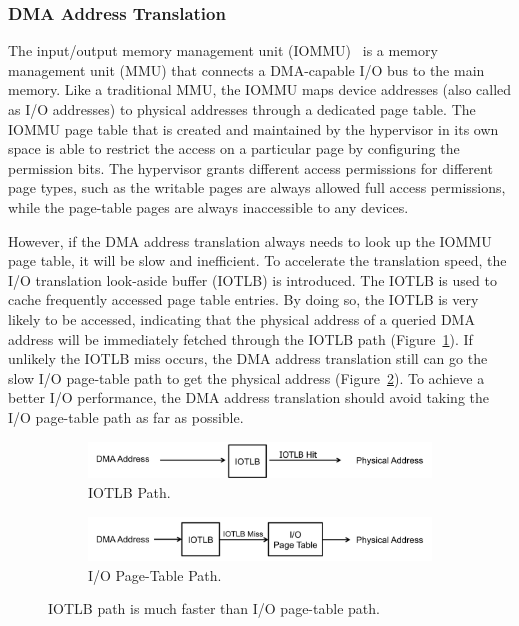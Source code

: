 \subsubsection{DMA Address Translation}
The input/output memory management unit (IOMMU)~\cite{intelvt} is a memory management unit (MMU) that connects a DMA-capable I/O bus to the main memory.
Like a traditional MMU, the IOMMU maps device addresses (also called as I/O addresses) to physical addresses through a dedicated page table.
The IOMMU page table that is created and maintained by the hypervisor in its own space is able to restrict the access on a particular page by configuring the permission bits.
The hypervisor grants different access permissions for different page types, such as the writable pages are always allowed full access permissions, while the page-table pages are always inaccessible to any devices.

However, if the DMA address translation always needs to look up the IOMMU page table, it will be slow and inefficient.
To accelerate the translation speed, the I/O translation look-aside buffer (IOTLB) is introduced.
The IOTLB is used to cache frequently accessed page table entries.
By doing so, the IOTLB is very likely to be accessed, indicating that the physical address of a queried DMA address will be immediately fetched through the IOTLB path (Figure~\ref{fig:iotlbpath}).
If unlikely the IOTLB miss occurs, the DMA address translation still can go the slow I/O page-table path to get the physical address (Figure~\ref{fig:ioptpath}).
To achieve a better I/O performance, the DMA address translation should avoid taking the I/O page-table path as far as possible.

\begin{figure}[!t]
    \begin{subfigure}{0.45\textwidth}
        \includegraphics[width=1\textwidth]{image/background/DMA-IOTLB-translation.png}
        \caption{\centering IOTLB Path.}
        \label{fig:iotlbpath}
    \end{subfigure}
    \vfill
    \begin{subfigure}{0.45\textwidth}
        \includegraphics[width=1\textwidth]{image/background/DMA-pt-translation.png}
        \caption{\centering I/O Page-Table Path.}
        \label{fig:ioptpath}
    \end{subfigure}
    \caption{IOTLB path is much faster than I/O page-table path.}
    \label{fig:dma-add-trans}
\end{figure}


